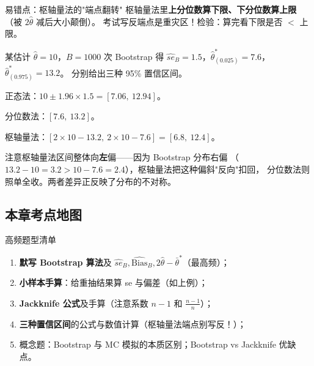 \begin{wbox}{易错点：枢轴量法的"端点翻转"}
枢轴量法里\textbf{上分位数算下限、下分位数算上限}（被 $2\hat\theta$ 减后大小颠倒）。
考试写反端点是重灾区！检验：算完看下限是否 $<$ 上限。
\end{wbox}

\begin{exbox}[三种区间数值题]
某估计 $\hat\theta=10$，$B=1000$ 次 Bootstrap 得
$\widehat{se}_B=1.5$，$\hat\theta^*_{(0.025)}=7.6$，$\hat\theta^*_{(0.975)}=13.2$。
分别给出三种 95\% 置信区间。
\end{exbox}
\begin{sol}
正态法：$10\pm1.96\times1.5=[7.06,\ 12.94]$。

分位数法：$[7.6,\ 13.2]$。

枢轴量法：$[2\times10-13.2,\ 2\times10-7.6]=[6.8,\ 12.4]$。

注意枢轴量法区间整体向\textbf{左}偏——因为 Bootstrap 分布右偏
（$13.2-10=3.2>10-7.6=2.4$），枢轴量法把这种偏斜"反向"扣回，
分位数法则照单全收。两者差异正反映了分布的不对称。
\end{sol}

\subsection{本章考点地图}

\begin{ebox}{高频题型清单}
\begin{enumerate}[leftmargin=2em]
  \item \textbf{默写 Bootstrap 算法}及 $\widehat{se}_B,\widehat{\mathrm{Bias}}_B,2\hat\theta-\bar\theta^*$（最高频）；
  \item \textbf{小样本手算}：给重抽结果算 se 与偏差（如上例）；
  \item \textbf{Jackknife 公式}及手算（注意系数 $n-1$ 和 $\frac{n-1}{n}$）；
  \item \textbf{三种置信区间}的公式与数值计算（枢轴量法端点别写反！）；
  \item 概念题：Bootstrap 与 MC 模拟的本质区别；Bootstrap vs Jackknife 优缺点。
\end{enumerate}
\end{ebox}
